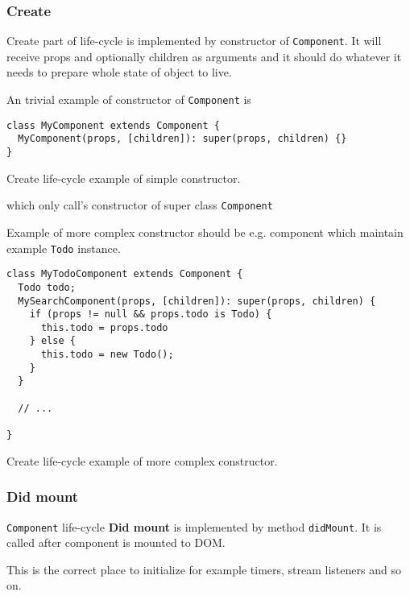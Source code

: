     \subsubsection{Create}\label{subsec:our-architecture-lifecycle-create}

      Create part of life-cycle is implemented by constructor of \texttt{Component}. 
      It will receive props and optionally children as arguments and 
      it should do whatever it needs to prepare whole state of object to live.

      An trivial example of constructor of \texttt{Component} is 
      \begin{listing}[H]
        \begin{verbatim}
class MyComponent extends Component {
  MyComponent(props, [children]): super(props, children) {}
}
        \end{verbatim}
        \caption{Create life-cycle example of simple constructor.}
        \label{subsec:our-architecture-lifecycle-create-example}
      \end{listing}
      which only call's constructor of super class \texttt{Component}

      Example of more complex constructor should be e.g. component 
      which maintain example \texttt{Todo} instance.
      \begin{listing}[H]
        \begin{verbatim}
class MyTodoComponent extends Component {
  Todo todo;
  MySearchComponent(props, [children]): super(props, children) {
    if (props != null && props.todo is Todo) {
      this.todo = props.todo
    } else {
      this.todo = new Todo();
    }
  }

  // ...

}
        \end{verbatim}
        \caption{Create life-cycle example of more complex constructor.}
        \label{subsec:our-architecture-lifecycle-create-example-complex}
      \end{listing}

    \subsubsection{Did mount}\label{subsec:our-architecture-lifecycle-didmount}

      \texttt{Component} life-cycle \textbf{Did mount} is implemented by method \texttt{didMount}. 
      It is called after component is mounted to DOM. 

      This is the correct place to initialize for example timers, stream listeners and so on. 

